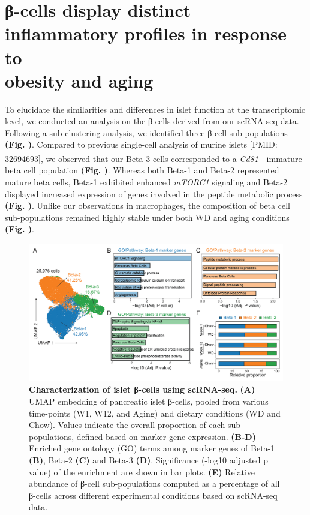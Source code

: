 \section{β-cells display distinct inflammatory profiles in response to\\obesity and aging}
\label{sec:chp2_betacells}

To elucidate the similarities and differences in islet function at the transcriptomic level, we conducted an analysis on the β-cells derived from our scRNA-seq data. Following a sub-clustering analysis, we identified three β-cell sub-populations \textbf{(Fig. )}. Compared to previous single-cell analysis of murine islets [PMID: 32694693], we observed that our Beta-3 cells corresponded to a \textit{Cd81}\textsuperscript{+} immature beta cell population \textbf{(Fig. )}. Whereas both Beta-1 and Beta-2 represented mature beta cells, Beta-1 exhibited enhanced \textit{mTORC1} signaling and Beta-2 displayed increased expression of genes involved in the peptide metabolic process \textbf{(Fig. )}. Unlike our observations in macrophages, the composition of beta cell sub-populations remained highly stable under both WD and aging conditions \textbf{(Fig. )}.\\

\begin{figure}[H]
    \centering
    \includegraphics[width=\linewidth]{Chapter4/Fig/F2-12-02.png}
    \caption[Characterization of islet β-cells using scRNA-seq]{\textbf{Characterization of islet β-cells using scRNA-seq.} \textbf{(A)} UMAP embedding of pancreatic islet β-cells, pooled from various time-points (W1, W12, and Aging) and dietary conditions (WD and Chow). Values indicate the overall proportion of each sub-populations, defined based on marker gene expression. \textbf{(B-D)} Enriched gene ontology (GO) terms among marker genes of Beta-1 \textbf{(B)}, Beta-2 \textbf{(C)} and Beta-3 \textbf{(D)}. Significance (-log10 adjusted p value) of the enrichment are shown in bar plots. \textbf{(E)} Relative abundance of β-cell sub-populations computed as a percentage of all β-cells across different experimental conditions based on scRNA-seq data.}
    \label{fig:chp2_betacells1}
\end{figure}

